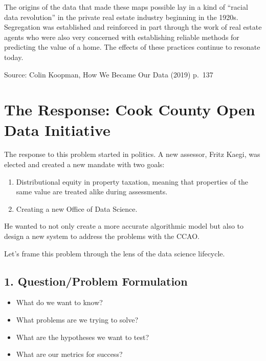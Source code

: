\documentclass[
  letterpaper,
  DIV=11,
  numbers=noendperiod]{scrreprt}
\providecommand{\tightlist}{%
  \setlength{\itemsep}{0pt}\setlength{\parskip}{0pt}}\usepackage{longtable,booktabs,array}
\begin{document}
The origins of the data that made these maps possible lay in a kind of
``racial data revolution'' in the private real estate industry beginning
in the 1920s. Segregation was established and reinforced in part through
the work of real estate agents who were also very concerned with
establishing reliable methods for predicting the value of a home. The
effects of these practices continue to resonate today.

Source: Colin Koopman, How We Became Our Data (2019) p.~137

\section{The Response: Cook County Open Data
Initiative}\label{the-response-cook-county-open-data-initiative}

The response to this problem started in politics. A new assessor, Fritz
Kaegi, was elected and created a new mandate with two goals:

\begin{enumerate}
\def\labelenumi{\arabic{enumi}.}
\tightlist
\item
  Distributional equity in property taxation, meaning that properties of
  the same value are treated alike during assessments.
\item
  Creating a new Office of Data Science.
\end{enumerate}

He wanted to not only create a more accurate algorithmic model but also
to design a new system to address the problems with the CCAO.

Let's frame this problem through the lens of the data science lifecycle.

\subsection{1. Question/Problem
Formulation}\label{questionproblem-formulation}

\begin{tcolorbox}[enhanced jigsaw, arc=.35mm, colbacktitle=quarto-callout-note-color!10!white, coltitle=black, bottomrule=.15mm, leftrule=.75mm, bottomtitle=1mm, colback=white, toptitle=1mm, breakable, titlerule=0mm, rightrule=.15mm, colframe=quarto-callout-note-color-frame, opacitybacktitle=0.6, left=2mm, title=\textcolor{quarto-callout-note-color}{\faInfo}\hspace{0.5em}{Driving Questions}, toprule=.15mm, opacityback=0]

\begin{itemize}
\tightlist
\item
  What do we want to know?
\item
  What problems are we trying to solve?
\item
  What are the hypotheses we want to test?
\item
  What are our metrics for success?
\end{itemize}

\end{tcolorbox}
\end{document}
